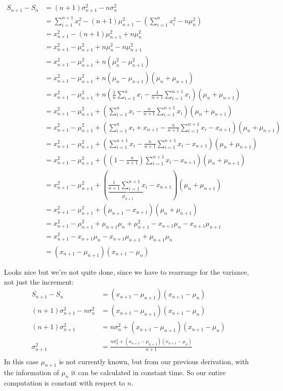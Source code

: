 \documentclass[english,12pt]{article}
\theoremstyle{plain}
\theoremstyle{definition}
\theoremstyle{definition} %
\newcommand{\brac}[1]{\left(#1\right)} %
\begin{document}
\begin{align*}
S_{n+1} - S_n &= (n+1)\sigma_{n+1}^2 - n\sigma_{n}^2\\
&= \sum_{i=1}^{n+1} x_i^2 - (n+1)\mu_{n+1}^2 - \brac{\sum_{i=1}^n x_i^2 - n\mu_n^2}\\
&= x_{n+1}^2 - (n+1)\mu_{n+1}^2 + n\mu_n^2\\
&= x_{n+1}^2 - \mu_{n+1}^2 + n\mu_n^2 - n\mu_{n+1}^2\\
&= x_{n+1}^2 - \mu_{n+1}^2 + n(\mu_n^2 - \mu_{n+1}^2)\\
&= x_{n+1}^2 - \mu_{n+1}^2 + n(\mu_n - \mu_{n+1})(\mu_n + \mu_{n+1})\\
&= x_{n+1}^2 - \mu_{n+1}^2 + n\brac{\frac{1}{n}\sum_{i=1}^nx_i-\frac{1}{n+1}\sum_{i=1}^{n+1}x_i}(\mu_n + \mu_{n+1})\\
&= x_{n+1}^2 - \mu_{n+1}^2 + \brac{\sum_{i=1}^nx_i-\frac{n}{n+1}\sum_{i=1}^{n+1}x_i}(\mu_n + \mu_{n+1})\\
&= x_{n+1}^2 - \mu_{n+1}^2 + \brac{\sum_{i=1}^nx_i + x_{n+1} - \frac{n}{n+1}\sum_{i=1}^{n+1}x_i - x_{n+1}}(\mu_n + \mu_{n+1})\\
&= x_{n+1}^2 - \mu_{n+1}^2 + \brac{\sum_{i=1}^{n+1}x_i - \frac{n}{n+1}\sum_{i=1}^{n+1}x_i - x_{n+1}}(\mu_n + \mu_{n+1})\\
&= x_{n+1}^2 - \mu_{n+1}^2 + \brac{\brac{1 - \frac{n}{n+1}}\sum_{i=1}^{n+1}x_i - x_{n+1}}(\mu_n + \mu_{n+1})\\
&= x_{n+1}^2 - \mu_{n+1}^2 + \brac{\underbrace{\frac{1}{n+1}\sum_{i=1}^{n+1}x_i}_{\mu_{n+1}} - x_{n+1}}(\mu_n + \mu_{n+1})\\
&= x_{n+1}^2 - \mu_{n+1}^2 + (\mu_{n+1} - x_{n+1})(\mu_n + \mu_{n+1})\\
&= x_{n+1}^2 - \mu_{n+1}^2 + \mu_{n+1}\mu_n + \mu_{n+1}^2 - x_{n+1}\mu_n - x_{n+1}\mu_{n+1}\\
&= x_{n+1}^2 - x_{n+1}\mu_n - x_{n+1}\mu_{n+1} + \mu_{n+1}\mu_n\\
&=(x_{n+1} - \mu_{n+1})(x_{n+1} - \mu_n)
\end{align*}

Looks nice but we're not quite done, since we have to rearrange for the variance, not just the increment:
\begin{align*}
S_{n+1} - S_n  &=(x_{n+1} - \mu_{n+1})(x_{n+1} - \mu_n)\\
(n+1)\sigma_{n+1}^2 - n\sigma_{n}^2 &=(x_{n+1} - \mu_{n+1})(x_{n+1} - \mu_n)\\
(n+1)\sigma_{n+1}^2  &= n\sigma_{n}^2 + (x_{n+1} - \mu_{n+1})(x_{n+1} - \mu_n)\\
\sigma_{n+1}^2  &= \frac{n\sigma_{n}^2 + (x_{n+1} - \mu_{n+1})(x_{n+1} - \mu_n)}{n+1}\\
\end{align*}
In this case $\mu_{n+1}$ is not currently known, but from our previous derivation, with the information of $\mu_n$ it can be calculated in constant time.  So our entire computation is constant with respect to $n$.
\end{document}
